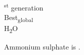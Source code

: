 \documentclass[10pt,a4paper]{article}
\begin{document}
{\Huge
{}\textsuperscript{st} generation\\

\noindent
Best\textsubscript{global} \\

\noindent
H\textsubscript{2}O \\

\noindent
Ammonium sulphate is .

}
\end{document}
